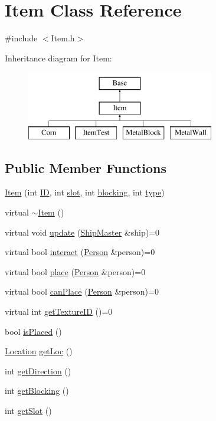\hypertarget{classItem}{\section{Item Class Reference}
\label{classItem}
}


{\ttfamily \#include $<$Item.\-h$>$}

Inheritance diagram for Item\-:\begin{figure}[H]
\begin{center}
\leavevmode
\includegraphics[height=3.000000cm]{classItem}
\end{center}
\end{figure}
\subsection*{Public Member Functions}
\begin{DoxyCompactItemize}
\item 
\hyperlink{classItem_ab416fe589031d8b8b8a1513431e9c37b}{Item} (int \hyperlink{classBase_a1dddc037afe2eae3e1364597e6a3cf46}{I\-D}, int \hyperlink{classItem_adcfbfc3a87d2112c62b812dac2c72993}{slot}, int \hyperlink{classItem_a5166900b24ba9e746a7ad34c00353cdd}{blocking}, int \hyperlink{classItem_a22a98aed7ce8f0314b597a5739c415b7}{type})
\item 
virtual \hyperlink{classItem_a33cc9c0bc556b5a33a9d0d58d37c602b}{$\sim$\-Item} ()
\item 
virtual void \hyperlink{classItem_af7cb35b77955c00a38fc0f952da762f4}{update} (\hyperlink{classShipMaster}{Ship\-Master} \&ship)=0
\item 
virtual bool \hyperlink{classItem_a65a4d68109b4aa82c62d262ab4786145}{interact} (\hyperlink{classPerson}{Person} \&person)=0
\item 
virtual bool \hyperlink{classItem_a2fc04b2fdd729977c419e0a1c5c8fa87}{place} (\hyperlink{classPerson}{Person} \&person)=0
\item 
virtual bool \hyperlink{classItem_afa9967b10984b1886ed6097eab7239e3}{can\-Place} (\hyperlink{classPerson}{Person} \&person)=0
\item 
virtual int \hyperlink{classItem_a38889163e99a1f5ec9b811b8e64fbc36}{get\-Texture\-I\-D} ()=0
\item 
bool \hyperlink{classItem_aca2ca239027e41044ce015c14c4feff6}{is\-Placed} ()
\item 
\hyperlink{structLocation}{Location} \hyperlink{classItem_aa72f158c8814721821eda26979106747}{get\-Loc} ()
\item 
int \hyperlink{classItem_a9f232e560cdaec93805b428349477c68}{get\-Direction} ()
\item 
int \hyperlink{classItem_a7e37d9c1fc049f82e521be5393d62329}{get\-Blocking} ()
\item 
int \hyperlink{classItem_a72be057b702678421b8c9b7efc8a9298}{get\-Slot} ()
\end{DoxyCompactItemize}
